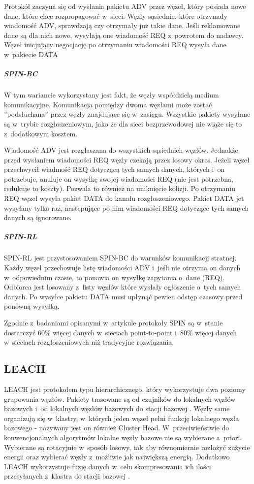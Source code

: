 Protokół zaczyna się od wysłania pakietu ADV przez węzeł, który posiada nowe dane, które chce rozpropagować w~sieci. Węzły sąsiednie, które otrzymały wiadomość ADV, sprawdzają czy otrzymały już takie dane. Jeśli reklamowane dane są dla nich nowe, wysyłają one wiadomość REQ z~powrotem do nadawcy. Węzeł inicjujący negocjację po otrzymaniu wiadomości REQ wysyła dane w~pakiecie DATA

\subparagraph{SPIN-BC}
W tym wariancie wykorzystany jest fakt, że węzły współdzielą medium komunikacyjne. Komunikacja pomiędzy dwoma węzłami może zostać ''podsłuchana'' przez węzły znajdujące się w~zasięgu. Wszystkie pakiety wysyłane są w~trybie rozgłoszeniowym, jako że dla sieci bezprzewodowej nie wiąże się to z~dodatkowym kosztem.

Wiadomość ADV jest rozgłaszana do wszystkich sąsiednich węzłów. Jednakże przed wysłaniem wiadomości REQ węzły czekają przez losowy okres. Jeżeli węzeł przechwycił wiadmość REQ dotyczącą tych samych danych, których i~on potrzebuje, anuluje on wysyłkę swojej wiadomości REQ (nie jest potrzebna, redukuje to koszty). Pozwala to również na uniknięcie kolizji. Po otrzymaniu REQ węzeł wysyła pakiet DATA do kanału rozgłoszeniowego. Pakiet DATA jet wysyłany tylko raz, następujące po nim wiadomości REQ dotyczące tych samych danych są ignorowane.
\subparagraph{SPIN-RL}
SPIN-RL jest przystosowaniem SPIN-BC do warunków komunikacji stratnej. Każdy węzeł przechowuje listę wiadomości ADV i~jeśli nie otrzyma on danych w~odpowiednim czasie, to ponawia on wysyłkę zapytania o~dane (REQ). Odbiorca jest losowany z~listy węzłów które wysłały ogłoszenie o~tych samych danych.
Po wysyłce pakietu DATA musi upłynąć pewien odstęp czasowy przed ponowną wysyłką.

Zgodnie z~badaniami opisanymi w~artykule \cite{Kulik2002} protokoły SPIN są w~stanie dostarczyć 60\% więcej danych w~sieciach point-to-point i~80\% więcej danych w~sieciach rozgłoszeniowych niż tradycyjne rozwiązania.  
\subsection{LEACH} \label{subsec:leach}
LEACH jest protokołem typu hierarchicznego, który wykorzystuje dwa poziomy grupowania węzłów. Pakiety trasowane są od czujników do lokalnych węzłów bazowych i~od lokalnych węzłów bazowych do stacji bazowej \cite{Yu2006}.
Węzły same organizują się w~klastry, w~których jeden węzeł pełni funkcję lokalnego węzła bazowego - nazywany jest on również Cluster Head. W~przeciwieństwie do konwencjonalnych algorytmów lokalne węzły bazowe nie są wybierane a~priori. Wybierane są rotacyjnie w~sposób losowy, tak aby równomiernie rozłożyć zużycie energii oraz wybierać węzły z~możliwie jak największą energią. Dodatkowo LEACH wykorzystuje fuzję danych w~celu skompresowania ich ilości przesyłanych z~klastra do stacji bazowej \cite{Akkaya2005, Heinzelman00}.


